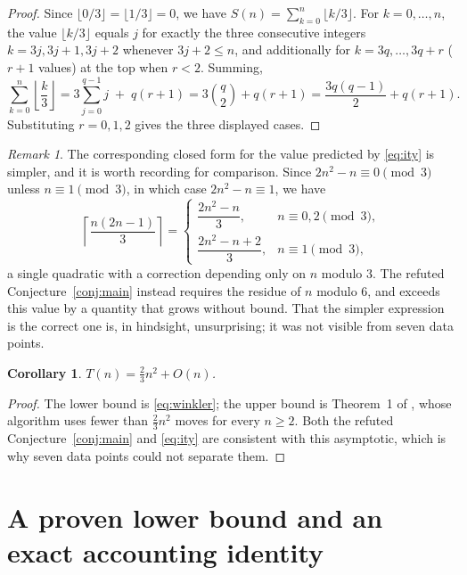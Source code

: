 \documentclass[11pt]{amsart}
\theoremstyle{plain}
\newtheorem{corollary}[theorem]{Corollary}
\theoremstyle{definition}
\theoremstyle{remark}
\newtheorem{remark}[theorem]{Remark}
\begin{document}
\begin{proof}
Since $\lfloor 0/3\rfloor = \lfloor 1/3\rfloor = 0$, we have $S(n) = \sum_{k=0}^{n}\lfloor k/3\rfloor$. For $k=0,\dots,n$, the value $\lfloor k/3\rfloor$ equals $j$ for exactly the three consecutive integers $k=3j,3j+1,3j+2$ whenever $3j+2\le n$, and additionally for $k=3q,\dots,3q+r$ ($r+1$ values) at the top when $r<2$. Summing,
\[
\sum_{k=0}^{n}\left\lfloor\frac{k}{3}\right\rfloor = 3\sum_{j=0}^{q-1} j \;+\; q(r+1) = 3\binom{q}{2} + q(r+1) = \frac{3q(q-1)}{2}+q(r+1).
\]
Substituting $r=0,1,2$ gives the three displayed cases. \qedhere
\end{proof}

\begin{remark}
The corresponding closed form for the value predicted by \eqref{eq:ity} is simpler, and it is worth recording for comparison. Since $2n^2-n\equiv 0 \pmod 3$ unless $n\equiv 1\pmod 3$, in which case $2n^2-n\equiv 1$, we have
\[
\left\lceil\frac{n(2n-1)}{3}\right\rceil =
\begin{cases}
\dfrac{2n^2-n}{3}, & n\equiv 0,2 \pmod 3,\\[6pt]
\dfrac{2n^2-n+2}{3}, & n\equiv 1 \pmod 3,
\end{cases}
\]
a single quadratic with a correction depending only on $n$ modulo $3$. The refuted Conjecture~\ref{conj:main} instead requires the residue of $n$ modulo $6$, and exceeds this value by a quantity that grows without bound. That the simpler expression is the correct one is, in hindsight, unsurprising; it was not visible from seven data points.
\end{remark}

\begin{corollary}
\label{cor:asymptotics}
$T(n) = \tfrac{2}{3}n^2 + O(n)$.
\end{corollary}

\begin{proof}
The lower bound is \eqref{eq:winkler}; the upper bound is Theorem~1 of \cite{ITY}, whose algorithm uses fewer than $\tfrac{2}{3}n^2$ moves for every $n\ge 2$. Both the refuted Conjecture~\ref{conj:main} and \eqref{eq:ity} are consistent with this asymptotic, which is why seven data points could not separate them.
\end{proof}

\section{A proven lower bound and an exact accounting identity}
\label{sec:lowerbound}
\end{document}
